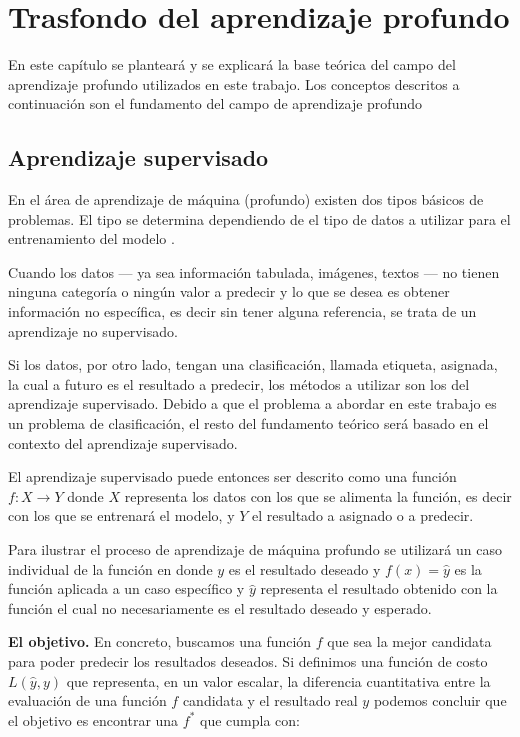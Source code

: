 
\chapter{Trasfondo del aprendizaje profundo} %

\label{Chapter2} %

En este capítulo se planteará y se explicará la base teórica del campo del aprendizaje profundo utilizados en este trabajo. Los conceptos descritos a continuación son el fundamento del campo de aprendizaje profundo


\section{Aprendizaje supervisado}

En el área de aprendizaje de máquina (profundo) existen dos tipos básicos de problemas. El tipo se determina dependiendo de el tipo de datos a utilizar para el entrenamiento del modelo \parencite{schmidhuber2015deep}.

Cuando los datos --- ya sea información tabulada, imágenes, textos --- no tienen ninguna categoría o ningún valor a predecir y lo que se desea es obtener información no específica, es decir sin tener alguna referencia, se trata de un aprendizaje no supervisado.

Si los datos, por otro lado, tengan una clasificación, llamada etiqueta, asignada, la cual a futuro es el resultado a predecir, los métodos a utilizar son los del aprendizaje supervisado. Debido a que el problema a abordar en este trabajo es un problema de clasificación, el resto del fundamento teórico será basado en el contexto del aprendizaje supervisado.

El aprendizaje supervisado puede entonces ser descrito como una función $f : X \to Y$ donde $X$ representa los datos con los que se alimenta la función, es decir con los que se entrenará el modelo, y $Y$ el resultado a asignado o a predecir.

Para ilustrar el proceso de aprendizaje de máquina profundo se utilizará un caso individual de la función en donde $y$ es el resultado deseado y $f(x) = \hat{y}$ es la función aplicada a un caso específico y $\hat{y}$ representa el resultado obtenido con la función el cual no necesariamente es el resultado deseado y esperado.

\textbf{El objetivo.} En concreto, buscamos una función $f$ que sea la mejor candidata para poder predecir los resultados deseados. Si definimos una función de costo $L(\hat{y}, y)$ que representa, en un valor escalar, la diferencia cuantitativa entre la evaluación de una función $f$ candidata y el resultado real $y$ podemos concluir que el objetivo es encontrar una $f^*$ que cumpla con:

